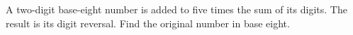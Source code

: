 A two-digit base-eight number is added to five times the sum of its digits. The result is its digit reversal. Find the original number in base eight.
